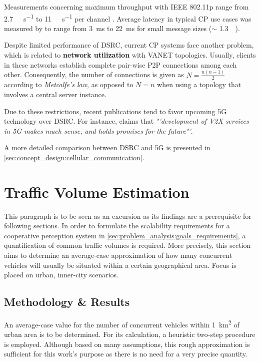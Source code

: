 Measurements concerning maximum throughput with IEEE 802.11p range from \SI{2.7}{\mega\bit\per\second} to \SI{11}{\mega\bit\per\second} per channel \cite{Chen2016, Wang2013}. Average latency in typical CP use cases was measured by \cite{Rauch2011} to range from \SI{3}{\milli\second} to \SI{22}{\milli\second} for small message sizes ($\sim$ \SI{1.3}{\kilo\byte}).

Despite limited performance of DSRC, current CP systems face another problem, which is related to \textbf{network utilization} with VANET topologies. Usually, clients in these networks establish complete pair-wise P2P connections among each other. Consequently, the number of connections is given as $N = \frac{n(n-1)}{2 }$ according to \textit{Metcalfe's law}, as opposed to $N = n$ when using a topology that involves a central server instance.

Due to these restrictions, recent publications tend to favor upcoming 5G technology \cite{Briegleb2019, 5GAutomotiveAssociation2016} over DSRC. For instance, \cite{Wevers2017} claims that \textit{"'development of V2X services in 5G makes much sense, and holds promises for the future"'}.

A more detailed comparison between DSRC and 5G is presented in \cref{sec:concept_design:cellular_communication}.

\section{Traffic Volume Estimation}
\label{sec:problem_analysis:traffic_volume_estimation}
This paragraph is to be seen as an excursion as its findings are a prerequisite for following sections. In order to formulate the scalability requirements for a cooperative perception system in \cref{sec:problem_analysis:goals_requirements}, a quantification of common traffic volumes is required. More precisely, this section aims to determine an average-case approximation of how many concurrent vehicles will usually be situated within a certain geographical area. Focus is placed on urban, inner-city scenarios. 

\subsection{Methodology \& Results}
\label{subsec:problem_analysis:methodology_results}
An average-case value for the number of concurrent vehicles within \SI{1}{\square\kilo\meter} of urban area is to be determined. For its calculation, a heuristic two-step procedure is employed. Although based on many assumptions, this rough approximation is sufficient for this work's purpose as there is no need for a very precise quantity. 

